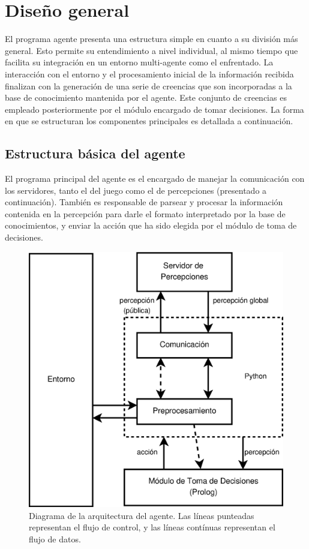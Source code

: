 \documentclass[oneside]{book}
\theoremstyle{definition}
\begin{document}
\section{Diseño general}

\label{sec:disenoGeneral}

El programa agente presenta una estructura simple en cuanto a su división más general. 
Esto permite su entendimiento a nivel individual, al mismo tiempo que facilita su 
integración en un entorno multi-agente como el enfrentado. La interacción con el entorno 
y el procesamiento inicial de la información recibida finalizan con la generación de una 
serie de creencias que son incorporadas a la base de conocimiento mantenida por el agente. 
Este conjunto de creencias es empleado posteriormente por el módulo encargado de tomar 
decisiones. La forma en que se estructuran los componentes principales es detallada a 
continuación.

\subsection{Estructura básica del agente}


El programa principal del agente es el encargado de manejar la comunicación con los 
servidores, tanto el del juego como el de percepciones (presentado 
a continuación). También es responsable de parsear y procesar la información contenida 
en la percepción para darle el formato interpretado por la base de conocimientos, y 
enviar la acción que ha sido elegida por el módulo de toma de decisiones.

\begin{figure}
 \centering
\includegraphics[scale=.4]{agent_architecture.eps}

 \caption{Diagrama de la arquitectura del agente. Las líneas punteadas representan el 
 flujo de control, y las líneas contínuas representan el flujo de datos.}
 \label{fig:architecture}
\end{figure}
\end{document}
